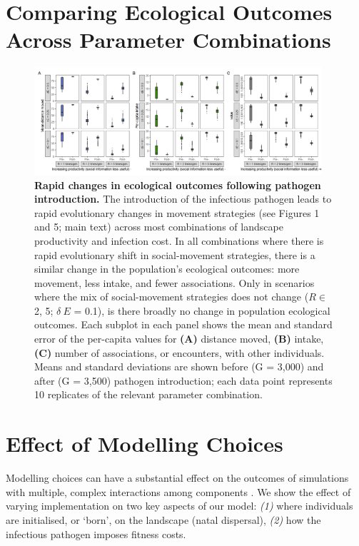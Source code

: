 \section*{Comparing Ecological Outcomes Across Parameter Combinations}

\begin{figure}
    \centering
    \includegraphics[width=0.95\textwidth]{figures/pathomove/fig_eco_compare_default.png}
    \caption{
        \textbf{Rapid changes in ecological outcomes following pathogen introduction.} 
        The introduction of the infectious pathogen leads to rapid evolutionary changes in movement strategies (see Figures 1 and 5; main text) across most combinations of landscape productivity and infection cost. 
        In all combinations where there is rapid evolutionary shift in social-movement strategies, there is a similar change in the population's ecological outcomes: more movement, less intake, and fewer associations. 
        Only in scenarios where the mix of social-movement strategies does not change (\(R \in\) 2, 5; $\delta~E$ = 0.1), is there broadly no change in population ecological outcomes. 
        Each subplot in each panel shows the mean and standard error of the per-capita values for \textbf{(A)} distance moved, \textbf{(B)} intake, \textbf{(C)} number of associations, or encounters, with other individuals. 
        Means and standard deviations are shown before (G = 3,000) and after (G = 3,500) pathogen introduction; each data point represents 10 replicates of the relevant parameter combination.
    }\label{fig:patho_eco_compare}
\end{figure}

\section*{Effect of Modelling Choices}

Modelling choices can have a substantial effect on the outcomes of simulations with multiple, complex interactions among components \parencite{scherer2020,gupte2021a,netz2021}.
We show the effect of varying implementation on two key aspects of our model: \textit{(1)} where individuals are initialised, or `born', on the landscape (natal dispersal), \textit{(2)} how the infectious pathogen imposes fitness costs.

